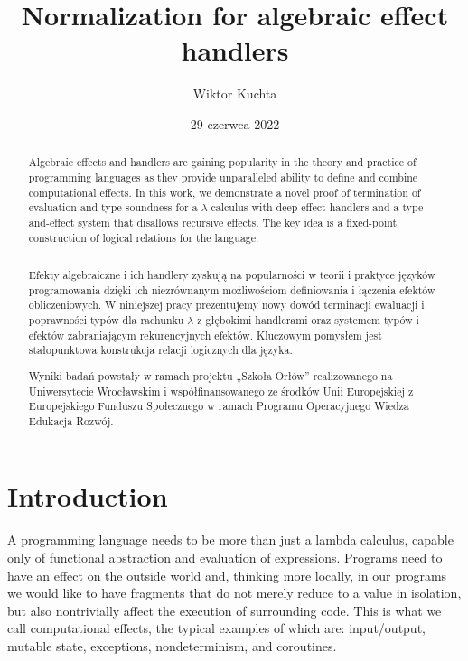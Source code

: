 \documentclass[a4paper, 11pt,titlepage, openright, twoside]{report}
\title{\textbf{Normalization for algebraic effect handlers}}
\author{Wiktor Kuchta}
\date{29 czerwca 2022} %
\newcommand{\+}{\enspace}
\begin{document}
\maketitle


\thispagestyle{empty}
\cleardoublepage
\begin{abstract}
	Algebraic effects and handlers are gaining popularity in the theory and practice
	of programming languages as they provide unparalleled ability to define and combine computational effects.
	In this work,
	we demonstrate a novel proof of termination of evaluation and type soundness for
	a $λ$-calculus with deep effect handlers and a type-and-effect system that
	disallows recursive effects.
	The key idea is a fixed-point construction of logical relations for the language.

	\begin{center} \rule[3pt]{300pt}{1pt} \end{center}

	Efekty algebraiczne i ich handlery zyskują na popularności w teorii i praktyce
	języków programowania dzięki ich niezrównanym możliwościom definiowania i łączenia efektów obliczeniowych.
	W niniejszej pracy
	prezentujemy nowy dowód terminacji ewaluacji i poprawności typów
	dla rachunku $λ$ z głębokimi handlerami oraz systemem typów i efektów zabraniającym
	rekurencyjnych efektów.
	Kluczowym pomysłem jest stałopunktowa konstrukcja relacji logicznych dla języka.


\vfil
Wyniki badań powstały w ramach projektu „Szkoła Orłów” realizowanego na Uniwersytecie Wrocławskim
i współfinansowanego ze środków Unii Europejskiej z Europejskiego Funduszu Społecznego w ramach
Programu Operacyjnego Wiedza Edukacja Rozwój.
\end{abstract}


\thispagestyle{empty}
\cleardoublepage
\setcounter{page}{5}
\tableofcontents

\chapter{Introduction}
A programming language needs to be more than just a lambda calculus,
capable only of functional abstraction and evaluation of expressions.
Programs need to have an effect on the outside world and, thinking more locally,
in our programs we would like to have fragments that do not merely reduce to a value in isolation,
but also nontrivially affect the execution of surrounding code.
This is what we call computational effects, the typical examples of which are:
input/output, mutable state, exceptions, nondeterminism, and coroutines.
\end{document}
